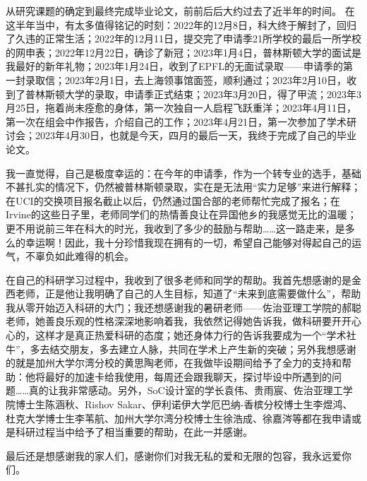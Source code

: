 
\begin{acknowledgements}

从研究课题的确定到最终完成毕业论文，前前后后大约过去了近半年的时间。
在这半年当中，有太多值得铭记的时刻：2022年的12月8日，科大终于解封了，回归了久违的正常生活；2022年的12月11日，提交完了申请季21所学校的最后一所学校的网申表；2022年12月22日，确诊了新冠；2023年1月4日，普林斯顿大学的面试是我最好的新年礼物；2023年1月24日，收到了EPFL的无面试录取——申请季的第一封录取信；2023年2月1日，去上海领事馆面签，顺利通过；2023年2月10日，收到了普林斯顿大学的录取，申请季正式结束；2023年3月20日，得了甲流；2023年3月25日，拖着尚未痊愈的身体，第一次独自一人启程飞跃重洋；2023年4月11日，第一次在组会中作报告，介绍自己的工作；2023年4月21日，第一次参加了学术研讨会；2023年4月30日，也就是今天，四月的最后一天，我终于完成了自己的毕业论文。

我一直觉得，自己是极度幸运的：在今年的申请季，作为一个转专业的选手，基础不甚扎实的情况下，仍然被普林斯顿录取，实在是无法用“实力足够”来进行解释；在UCI的交换项目报名截止以后，仍然通过国合部的老师帮忙完成了报名；在Irvine的这些日子里，老师同学们的热情善良让在异国他乡的我感觉无比的温暖；更不用说前三年在科大的时光，我收到了多少的鼓励与帮助……这一路走来，是多么的幸运啊！因此，我十分珍惜我现在拥有的一切，希望自己能够对得起自己的运气，不辜负如此难得的机会。

在自己的科研学习过程中，我收到了很多老师和同学的帮助。我首先想感谢的是金西老师，正是他让我明确了自己的人生目标，知道了“未来到底需要做什么”，帮助我从零开始迈入科研的大门；我还想感谢我的暑研老师——佐治亚理工学院的郝聪老师，她善良乐观的性格深深地影响着我，我依然记得她告诉我，做科研要开开心心的，这样才是真正热爱科研的态度；她还身体力行的告诉我要成为一个“学术社牛”，多去结交朋友，多去建立人脉，共同在学术上产生新的突破；另外我想感谢的就是加州大学尔湾分校的黄思陶老师，在我做毕设期间给予了全力的支持和帮助：他将最好的加速卡给我使用，每周还会跟我聊天，探讨毕设中所遇到的问题……真的让我非常感动。另外，SoC设计室的学长袁伟、贵雨宸、佐治亚理工学院博士生陈涵秋、Rishov Sakar、伊利诺伊大学厄巴纳-香槟分校博士生李煜鸿、杜克大学博士生李苇航、加州大学尔湾分校博士生徐浩成、徐嘉涔等都在我申请或是科研过程当中给予了相当重要的帮助，在此一并感谢。

最后还是想感谢我的家人们，感谢你们对我无私的爱和无限的包容，我永远爱你们。

\end{acknowledgements}
